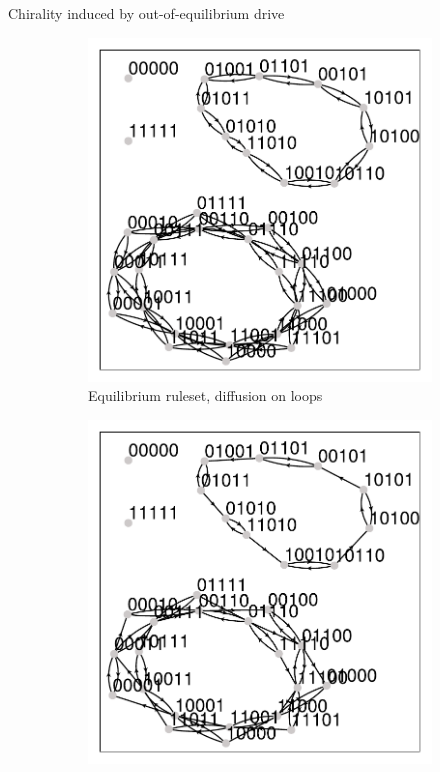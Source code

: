 \documentclass[10pt,mathserif]{beamer}
\begin{document}
\begin{frame}[fragile]{Chirality induced by out-of-equilibrium drive}
	\newrefsection
	\begin{figure}
		\centering
        \begin{subfigure}{0.49\textwidth}
			\centering
			\includegraphics[width=\textwidth]{figures/ned_r150_N5_square.pdf}
            \caption{
                Equilibrium ruleset, diffusion on loops
            }
		\end{subfigure}
        \begin{subfigure}{0.49\textwidth}
			\centering
			\includegraphics[width=\textwidth]{figures/ned_r134_N5_square.pdf}

\end{subfigure}
\end{figure}
\end{frame}
\end{document}
